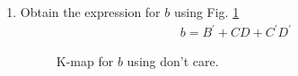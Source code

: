 \renewcommand{\theequation}{\theenumi}
\renewcommand{\thefigure}{\theenumi}
\begin{enumerate}[label=\thesubsection.\arabic*.,ref=\thesubsection.\theenumi]

\item Obtain the expression for $b$ using Fig. \ref{fig:disp_kmapX_b}
%
\solution
\begin{align}
\label{eq:kmap_dispX_b}
b=B^{\prime}+CD+C^{\prime}D^{\prime}
\end{align}
%
\begin{figure}[!ht]
\centering
\resizebox{\columnwidth}{!} {

}
\caption{K-map for $b$ using don't care.}
\label{fig:disp_kmapX_b}
\end{figure}

%
\end{enumerate}
%
